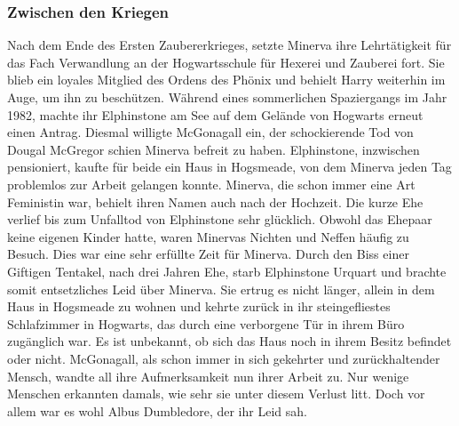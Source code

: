 \documentclass[a4paper, 10pt]{article}
\begin{document}
\subsubsection*{\large Zwischen den Kriegen}
Nach dem Ende des Ersten Zaubererkrieges, setzte Minerva ihre Lehrtätigkeit für das Fach Verwandlung an der Hogwartsschule für Hexerei und Zauberei fort. Sie blieb ein loyales Mitglied des Ordens des Phönix und behielt Harry weiterhin im Auge, um ihn zu beschützen.
\vspace{10pt}
\newline
{}  
Während eines sommerlichen Spaziergangs im Jahr 1982, machte ihr Elphinstone am See auf dem Gelände von Hogwarts erneut einen Antrag. Diesmal willigte McGonagall ein, der schockierende Tod von Dougal McGregor schien Minerva befreit zu haben. Elphinstone, inzwischen pensioniert, kaufte für beide ein Haus in Hogsmeade, von dem Minerva jeden Tag problemlos zur Arbeit gelangen konnte. Minerva, die schon immer eine Art Feministin war, behielt ihren Namen auch nach der Hochzeit. Die kurze Ehe verlief bis zum Unfalltod von Elphinstone sehr glücklich. Obwohl das Ehepaar keine eigenen Kinder hatte, waren Minervas Nichten und Neffen häufig zu Besuch. Dies war eine sehr erfüllte Zeit für Minerva.
\vspace{10pt}
\newline
{}  
Durch den Biss einer Giftigen Tentakel, nach drei Jahren Ehe, starb Elphinstone Urquart und brachte somit entsetzliches Leid 
über Minerva. Sie ertrug es nicht länger, allein in dem Haus in Hogsmeade zu wohnen und kehrte zurück in ihr steingefliestes Schlafzimmer in Hogwarts, das durch eine verborgene Tür in ihrem Büro zugänglich war. Es ist unbekannt, ob sich das Haus noch in ihrem Besitz befindet oder nicht. McGonagall, als schon immer in sich gekehrter und zurückhaltender Mensch, wandte all ihre Aufmerksamkeit nun ihrer Arbeit zu. Nur wenige Menschen erkannten damals, wie sehr sie unter diesem Verlust litt. Doch vor allem war es wohl Albus Dumbledore, der ihr Leid sah.
\end{document}
